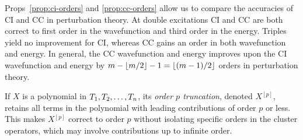 \documentclass[11pt]{article}
\numberwithin{equation}{section}
\newcommand{\bord}[1]{\ensuremath{^{[#1]}}}
\begin{document}
\begin{ex}
Props~\ref{prop:ci-orders} and \ref{prop:cc-orders} allow us to compare the accuracies of CI and CC in perturbation theory.
At double excitations CI and CC are both correct to first order in the wavefunction and third order in the energy.
Triples yield no improvement for CI, whereas CC gains an order in both wavefunction and energy.
In general, the CC wavefunction and energy improves upon the CI wavefunction and energy by
$
  m
-
  \left\lfloor m/2\right\rfloor
-
  1
=
  \left\lfloor(m-1)/2\right\rfloor
$
orders in perturbation theory.
\end{ex}

\begin{dfn}
If $X$ is a polynomial in $T_1,T_2,\ldots,T_n$,
its \textit{order $p$ truncation}, denoted $X\bord{p}$, retains all terms in the polynomial with leading contributions of order $p$ or less.
This makes $X\bord{p}$ correct to order $p$ without isolating specific orders in the cluster operators, which may involve contributions up to infinite order.
\end{dfn}
\end{document}
